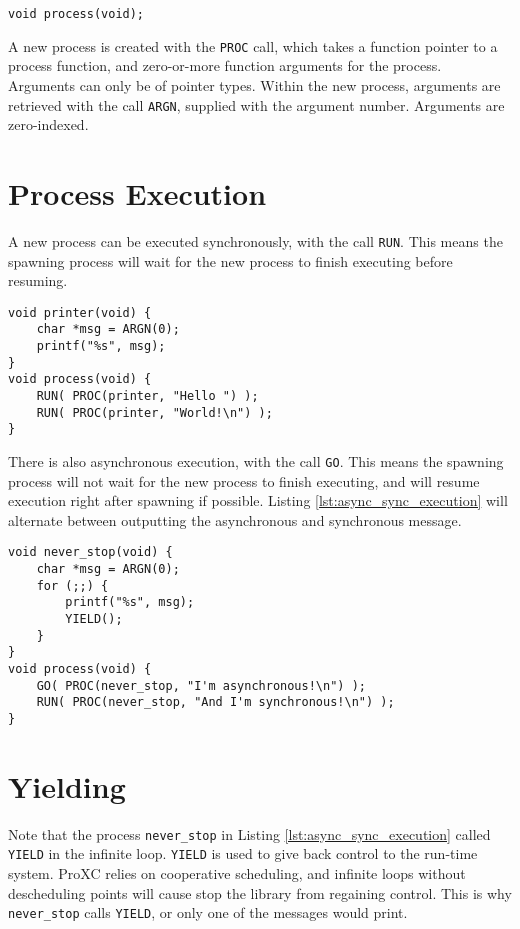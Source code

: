 \begin{lstlisting}[style={CustomC},frame={},numbers={none}]
void process(void);
\end{lstlisting}

A new process is created with the \texttt{PROC} call, which takes a function pointer to a process function, and zero\hyp{}or\hyp{}more function arguments for the process. Arguments can only be of pointer types. Within the new process, arguments are retrieved with the call \texttt{ARGN}, supplied with the argument number. Arguments are zero\hyp{}indexed. 

\section*{Process Execution}

A new process can be executed synchronously, with the call \texttt{RUN}. This means the spawning process will wait for the new process to finish executing before resuming.

\begin{lstlisting}[style={CustomC},caption={Hello World with multiple processes}]
void printer(void) {
    char *msg = ARGN(0);
    printf("%s", msg);
}
void process(void) {
    RUN( PROC(printer, "Hello ") );
    RUN( PROC(printer, "World!\n") );
}
\end{lstlisting}

There is also asynchronous execution, with the call \texttt{GO}. This means the spawning process will not wait for the new process to finish executing, and will resume execution right after spawning if possible. Listing \ref{lst:async_sync_execution} will alternate between outputting the asynchronous and synchronous message.

\begin{lstlisting}[style={CustomC},caption={Asynchronous and synchronous execution},label={lst:async_sync_execution}]
void never_stop(void) {
    char *msg = ARGN(0);
    for (;;) {
        printf("%s", msg);
        YIELD();
    }
}
void process(void) {
    GO( PROC(never_stop, "I'm asynchronous!\n") );
    RUN( PROC(never_stop, "And I'm synchronous!\n") );
}
\end{lstlisting}

\section*{Yielding}

Note that the process \texttt{never\_stop} in Listing \ref{lst:async_sync_execution} called \texttt{YIELD} in the infinite loop. \texttt{YIELD} is used to give back control to the run\hyp{}time system. ProXC relies on cooperative scheduling, and infinite loops without descheduling points will cause stop the library from regaining control. This is why \texttt{never\_stop} calls \texttt{YIELD}, or only one of the messages would print. 


